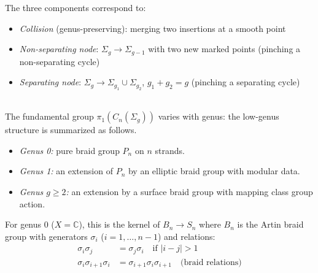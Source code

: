 The three components correspond to:
\begin{itemize}
\item \emph{Collision} (genus-preserving): merging two insertions at a smooth point
\item \emph{Non-separating node}: $\Sigma_g \to \Sigma_{g-1}$ with two new marked points (pinching a non-separating cycle)
\item \emph{Separating node}: $\Sigma_g \to \Sigma_{g_1} \cup \Sigma_{g_2}$, $g_1 + g_2 = g$ (pinching a separating cycle)
\end{itemize}

 
\begin{proposition}
\label{prop:fundamental-group-genera}
\leavevmode\\
The fundamental group $\pi_1(C_n(\Sigma_g))$ varies with genus:
the low-genus structure is summarized as follows.
\begin{itemize}
\item \emph{Genus 0:} pure braid group $P_n$ on $n$ strands.
\item \emph{Genus 1:} an extension of $P_n$ by an elliptic braid group with modular data.
\item \emph{Genus $g \geq 2$:} an extension by a surface braid group with mapping class group action.
\end{itemize}

For genus 0 ($X = \mathbb{C}$), this is the kernel of $B_n \to S_n$ where $B_n$ is the Artin braid group with generators $\sigma_i$ ($i = 1, \ldots, n-1$) and relations:
\begin{align}
\sigma_i\sigma_j &= \sigma_j\sigma_i \quad \text{if } |i-j| > 1 \\
\sigma_i\sigma_{i+1}\sigma_i &= \sigma_{i+1}\sigma_i\sigma_{i+1} \quad \text{(braid relations)}
\end{align}
\end{proposition}
 
 
